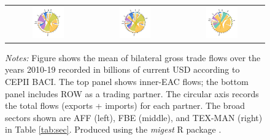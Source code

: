 \documentclass[a4paper]{article}
\begin{document}
\begin{figure}[h!]
{\begin{tabular}{ccc}
\includegraphics[width=0.4\textwidth, trim= {0.85cm 0.8cm 1.1cm 1cm}, clip]{"BACI_MIG_AGR_2010_19_ROW.pdf"} & \includegraphics[width=0.4\textwidth, trim= {0.85cm 0.8cm 1.1cm 1cm}, clip]{"BACI_MIG_FBE_2010_19_ROW.pdf"} &
\includegraphics[width=0.4\textwidth, trim= {0.85cm 0.8cm 1cm 1cm}, clip]{"BACI_MIG_MAN_2010_19_ROW.pdf"} \\
\end{tabular}
}
\raggedright
\scriptsize 
\emph{Notes:} Figure shows the mean of bilateral gross trade flows over the years 2010-19 recorded in billions of current USD according to CEPII BACI. The top panel shows inner-EAC flows; the bottom panel includes ROW as a trading partner. The circular axis records the total flows (exports + imports) for each partner. The broad sectors shown are AFF (left), FBE (middle), and TEX-MAN (right) in Table \ref{tab:sec}. Produced using the \emph{migest} R package \citep{rmigest}.
\end{figure}
\FloatBarrier
\end{document}
